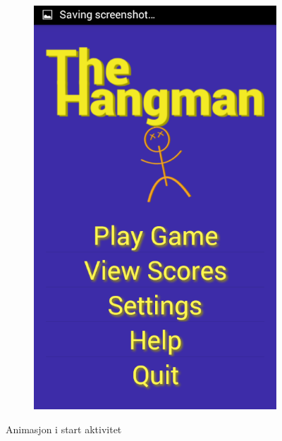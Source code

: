 \begin{figure}[ht]
\begin{subfigure}[b]{0.25\textwidth}
        \includegraphics[width=\textwidth]{./img/gui/a3.png}
    \end{subfigure}
    \caption{Animasjon i start aktivitet}
    \label{fig:hangman_animasjon}
\end{figure}


